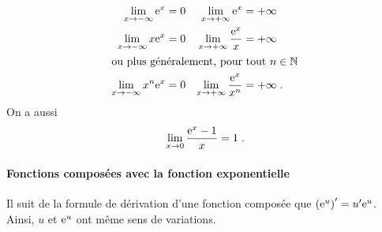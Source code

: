       \begin{thm}
            \begin{align*}
                  \lim_{x\rightarrow-\infty} \mathrm{e}^{x} & = 0     & \lim_{x\rightarrow+\infty} \mathrm{e}^{x} & = +\infty \\
                  \lim_{x\rightarrow-\infty} x \mathrm{e}^{x} & = 0   & \lim_{x\rightarrow+\infty} \frac{\mathrm{e}^{x}}{x} & = +\infty \\
                \intertext{ou plus g\'en\'eralement, pour tout $n\in\mathbb{N}$}
                  \lim_{x\rightarrow-\infty} x^n \mathrm{e}^{x} & = 0 & \lim_{x\rightarrow+\infty} \frac{\mathrm{e}^{x}}{x^n} & = +\infty\;.
            \end{align*}
            On a aussi 
                  \[
                        \lim_{x\rightarrow 0} \frac{\mathrm{e}^{x}-1}{x} = 1      \;.
                  \]
      \end{thm}
      \paragraph{Fonctions compos\'ees avec la fonction exponentielle}
            Il suit de la formule de d\'erivation d'une fonction compos\'ee que 
            $\left( \mathrm{e}^{u} \right)' = u' \mathrm{e}^{u}$.
            Ainsi, $u$ et $\mathrm{e}^{u}$ ont m\^eme sens de variations.
